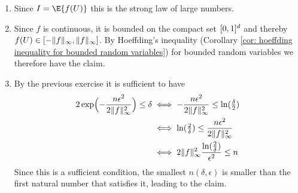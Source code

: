 \begin{solution}
\begin{enumerate}[wide=0pt]
    \item[\ref{it: (monte carlo) convergence}]
    Since \(I= \E{f(U)}\) this is the strong law of large numbers.

    \item[\ref{it: (monte carlo) PAC bound}]
    Since \(f\) is continuous, it is bounded on the compact set \([0,1]^d\)
    and thereby \(f(U) \in [-\lVert f\rVert_\infty, \lVert f\rVert_\infty]\).
    By Hoeffding's inequality (Corollary \ref{cor: hoeffding inequality for bounded random variables})
    for bounded random variables we therefore have the claim.

    \item[\ref{it: (monte carlo) sample complexity}]
    By the previous exercise it is sufficient to have
    \begin{align*}
        2\exp\Bigl(-\frac{n\epsilon^2}{2\lVert f\rVert_\infty^2}\Bigr) \le \delta
        &\iff -\frac{n\epsilon^2}{2\lVert f\rVert_\infty^2} \le \ln(\tfrac{\delta}2)
        \\
        &\iff \ln(\tfrac{2}\delta) \le \frac{n \epsilon^2}{2\lVert f\rVert_\infty^2}
        \\
        &\iff 2\lVert f\rVert_\infty^2 \frac{\ln(\tfrac2\delta)}{\epsilon^2} \le n
    \end{align*}
    Since this is a sufficient condition, the smallest \(n(\delta, \epsilon)\)
    is smaller than the first natural number that satisfies it, leading
    to the claim.
    \qedhere
\end{enumerate}
\end{solution}

